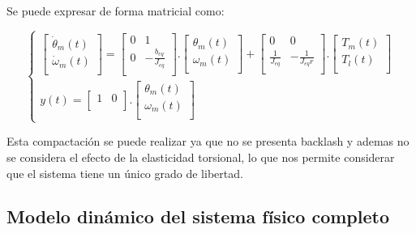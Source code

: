 \documentclass{article}
\begin{document}
Se puede expresar de forma matricial como:

\begin{equation}
\begin{cases}
    \begin{bmatrix}
        \dot{\theta}_{m}(t)\\
        \dot{\omega}_{m}(t)\\
    \end{bmatrix}
    =
    \begin{bmatrix}
        0 & 1\\
        0 & -\frac{b_{eq}}{J_{eq}}\\
    \end{bmatrix}.
    \begin{bmatrix}
        \theta_{m}(t)\\
        \omega_{m}(t)\\
    \end{bmatrix}
    +
    \begin{bmatrix}
        0 & 0\\
        \frac{1}{J_{eq}} & -\frac{1}{J_{eq}r}\\
    \end{bmatrix}.
    \begin{bmatrix}
        T_{m}(t)\\
        T_{l}(t)\\
    \end{bmatrix}\\
    y(t) = 
    \begin{bmatrix} 1 & 0\\ \end{bmatrix} .
    \begin{bmatrix} \theta_{m}(t)\\ \omega_{m}(t)\\ \end{bmatrix}
\end{cases}
\end{equation}

Esta compactación se puede realizar ya que no se presenta backlash y ademas no se considera el efecto de 
la elasticidad torsional, lo que nos permite considerar que el sistema tiene un único grado de libertad.


\subsection{Modelo dinámico del sistema físico completo}
\end{document}
